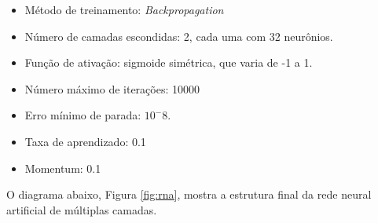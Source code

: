 \documentclass[10pt,journal,compsoc]{IEEEtran}
\begin{document}
\begin{itemize}  
\item Método de treinamento: \textit{Backpropagation}
\item Número de camadas escondidas: 2, cada uma com 32 neurônios.
\item Função de ativação: sigmoide simétrica, que varia de -1 a 1.
\item Número máximo de iterações: 10000
\item Erro mínimo de parada:  $10 ^ -8$.
\item Taxa de aprendizado: 0.1
\item Momentum: 0.1

\end{itemize}

O diagrama abaixo, Figura \ref{fig:rna}, mostra a estrutura final da rede neural artificial de múltiplas camadas.


\end{document}
